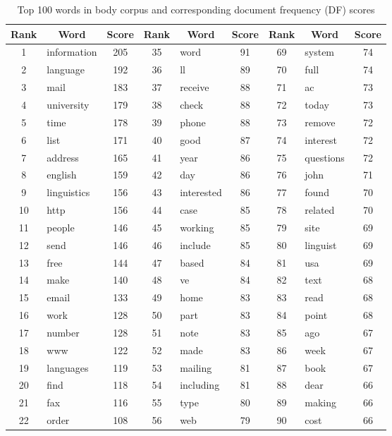 \documentclass[10pt, a4paper]{article}
\begin{document}
\begin{table}[h!]
\caption{Top 100 words in body corpus and corresponding document frequency (DF) scores}\vspace{1em}
\begin{tabular}{|c|l|c||c|l|c||c|l|c|}
\hline
\textbf{Rank} & \multicolumn{1}{c|}{\textbf{Word}} & \textbf{Score}
	& \textbf{Rank} & \multicolumn{1}{c|}{\textbf{Word}} & \textbf{Score}
	& \textbf{Rank} & \multicolumn{1}{c|}{\textbf{Word}} & \textbf{Score}\\
\hline\hline
1 & information & 205 & 35 & word & 91 & 69 & system & 74 \\
2 & language & 192 & 36 & ll & 89 & 70 & full & 74 \\
3 & mail & 183 & 37 & receive & 88 & 71 & ac & 73 \\
4 & university & 179 & 38 & check & 88 & 72 & today & 73 \\
5 & time & 178 & 39 & phone & 88 & 73 & remove & 72 \\
6 & list & 171 & 40 & good & 87 & 74 & interest & 72 \\
7 & address & 165 & 41 & year & 86 & 75 & questions & 72 \\
8 & english & 159 & 42 & day & 86 & 76 & john & 71 \\
9 & linguistics & 156 & 43 & interested & 86 & 77 & found & 70 \\
10 & http & 156 & 44 & case & 85 & 78 & related & 70 \\
11 & people & 146 & 45 & working & 85 & 79 & site & 69 \\
12 & send & 146 & 46 & include & 85 & 80 & linguist & 69 \\
13 & free & 144 & 47 & based & 84 & 81 & usa & 69 \\
14 & make & 140 & 48 & ve & 84 & 82 & text & 68 \\
15 & email & 133 & 49 & home & 83 & 83 & read & 68 \\
16 & work & 128 & 50 & part & 83 & 84 & point & 68 \\
17 & number & 128 & 51 & note & 83 & 85 & ago & 67 \\
18 & www & 122 & 52 & made & 83 & 86 & week & 67 \\
19 & languages & 119 & 53 & mailing & 81 & 87 & book & 67 \\
20 & find & 118 & 54 & including & 81 & 88 & dear & 66 \\
21 & fax & 116 & 55 & type & 80 & 89 & making & 66 \\
22 & order & 108 & 56 & web & 79 & 90 & cost & 66 \\

\end{tabular}
\end{table}
\end{document}
